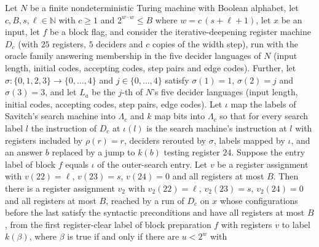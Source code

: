 \begin{theorem}
\label{Complexity.LogProg.SavitchARM.dp_block}
\leanok
{}
Let $N$ be a finite nondeterministic Turing machine with Boolean alphabet, let $c,B,s,\ell\in
\mathbb{N}$ with $c\ge1$ and $2^{w\cdot w}\le B$ where $w=c\,(s+\ell+1)$, let $x$ be an input,
let $f$ be a block flag, and consider the iterative-deepening register machine $D_c$ (with $25$ registers, $5$ deciders and $c$ copies of the width step), run with the oracle family answering membership in the five decider languages of $N$ (input length, initial codes, accepting codes, step pairs and edge codes). Further, let $\sigma:\{0,1,2,3\}\to\{0,\dots,4\}$ and $j\in\{0,\dots,4\}$ satisfy $\sigma(1)=1$,
$\sigma(2)=j$ and $\sigma(3)=3$, and let $L_a$ be the $j$-th of $N$'s five decider languages
(input length, initial codes, accepting codes, step pairs, edge codes). Let $\iota$ map the labels
of Savitch's search machine into $\Lambda_c$ and $k$ map bits into $\Lambda_c$ so that for every
search label $l$ the instruction of $D_c$ at $\iota(l)$ is the search machine's instruction at $l$
with registers included by $\rho(r)=r$, deciders rerouted by $\sigma$, labels mapped by $\iota$,
and an answer $b$ replaced by a jump to $k(b)$ testing register $24$. Suppose the entry
label of block $f$ equals $\iota$ of the outer-search entry. Let $v$ be a register assignment with
$v(22)=\ell$, $v(23)=s$, $v(24)=0$ and all registers at most $B$. Then there is a register
assignment $v_2$ with $v_2(22)=\ell$, $v_2(23)=s$, $v_2(24)=0$ and all registers at most $B$,
reached by a run of $D_c$ on $x$ whose configurations before the last satisfy the syntactic
preconditions and have all registers at most $B$, from the first register-clear label of block
preparation $f$ with registers $v$ to label $k(\beta)$, where $\beta$ is true if and only if there are $u<2^w$ with

\end{theorem}
